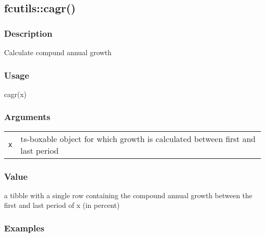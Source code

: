 \documentclass[
  letterpaper,
  DIV=11,
  numbers=noendperiod]{scrreport}
\newenvironment{Shaded}{\begin{snugshade}}{\end{snugshade}}
\newcommand{\FunctionTok}[1]{\textcolor[rgb]{0.28,0.35,0.67}{#1}}
\newcommand{\NormalTok}[1]{\textcolor[rgb]{0.00,0.23,0.31}{#1}}
\begin{document}
\subsection{fcutils::cagr()}\label{fcutilscagr}

\subsubsection{Description}\label{description-47}

Calculate compund annual growth

\subsubsection{Usage}\label{usage-47}

\begin{Shaded}
\begin{Highlighting}[]
\FunctionTok{cagr}\NormalTok{(x)}
\end{Highlighting}
\end{Shaded}

\subsubsection{Arguments}\label{arguments-47}

\begin{longtable}[]{@{}ll@{}}
\toprule\noalign{}
\endhead
\bottomrule\noalign{}
\endlastfoot
\texttt{x} & ts-boxable object for which growth is calculated between
first and last period \\
\end{longtable}

\subsubsection{Value}\label{value-47}

a tibble with a single row containing the compound annual growth between
the first and last period of x (in percent)

\subsubsection{Examples}\label{examples-47}
\end{document}
